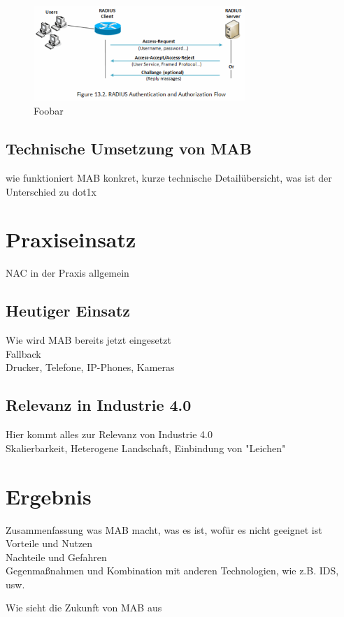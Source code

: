 \documentclass[conference]{IEEEtran}
\begin{document}
\begin{figure}[hbt]
	\centering
	\includegraphics[width=8cm]{figures/Radius}
	\caption{Foobar \cite{einstein}}
\end{figure}

\subsection{Technische Umsetzung von MAB}
wie funktioniert MAB konkret, kurze technische Detailübersicht, was ist der Unterschied zu dot1x

%

\section{Praxiseinsatz}
NAC in der Praxis allgemein

\subsection{Heutiger Einsatz}
Wie wird MAB bereits jetzt eingesetzt\\
Fallback\\
Drucker, Telefone, IP-Phones, Kameras

\subsection{Relevanz in Industrie 4.0}
Hier kommt alles zur Relevanz von Industrie 4.0\\
Skalierbarkeit, Heterogene Landschaft, Einbindung von "Leichen"

%

\newpage

\section{Ergebnis}
Zusammenfassung was MAB macht, was es ist, wofür es nicht geeignet ist\\
Vorteile und Nutzen\\
Nachteile und Gefahren\\
Gegenmaßnahmen und Kombination mit anderen Technologien, wie z.B. IDS, usw.
\newline

Wie sieht die Zukunft von MAB aus

%



\end{document}
